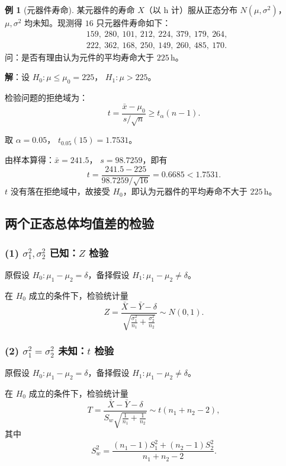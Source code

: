 \documentclass[11pt,a4paper]{report}
\theoremstyle{definition}
\newtheorem{example}{例}[chapter]
\begin{document}
\begin{example}[元器件寿命]
某元器件的寿命 $X$（以 h 计）服从正态分布 $N(\mu,\sigma^{2})$，$\mu,\sigma^{2}$ 均未知。现测得 $16$ 只元器件寿命如下：
\[
\begin{aligned}
&159,\ 280,\ 101,\ 212,\ 224,\ 379,\ 179,\ 264,\\
&222,\ 362,\ 168,\ 250,\ 149,\ 260,\ 485,\ 170.
\end{aligned}
\]
问：是否有理由认为元件的平均寿命大于 $225\,\mathrm{h}$。

\textbf{解}：设 $H_{0}\colon\mu\leq\mu_{0}=225$， $H_{1}\colon\mu>225$。

检验问题的拒绝域为：
\[
t=\frac{\bar{x}-\mu_{0}}{s/\sqrt{n}}\geq t_{\alpha}(n-1).
\]

取 $\alpha=0.05$， $t_{0.05}(15)=1.7531$。

由样本算得：$\bar{x}=241.5$， $s=98.7259$，即有
\[
t=\frac{241.5-225}{98.7259/\sqrt{16}}=0.6685<1.7531.
\]
$t$ 没有落在拒绝域中，故接受 $H_{0}$，即认为元器件的平均寿命不大于 $225\,\mathrm{h}$。
\end{example}

\subsection{两个正态总体均值差的检验}

\subsubsection*{(1) $\sigma_{1}^{2},\sigma_{2}^{2}$ 已知：$Z$ 检验}

原假设 $H_{0}\colon\mu_{1}-\mu_{2}=\delta$，备择假设 $H_{1}\colon\mu_{1}-\mu_{2}\neq\delta$。

在 $H_{0}$ 成立的条件下，检验统计量
\[
Z=\frac{\bar{X}-\bar{Y}-\delta}{\sqrt{\frac{\sigma_{1}^{2}}{n_{1}}+\frac{\sigma_{2}^{2}}{n_{2}}}}\sim N(0,1).
\]

\subsubsection*{(2) $\sigma_{1}^{2}=\sigma_{2}^{2}$ 未知：$t$ 检验}

原假设 $H_{0}\colon\mu_{1}-\mu_{2}=\delta$，备择假设 $H_{1}\colon\mu_{1}-\mu_{2}\neq\delta$。

在 $H_{0}$ 成立的条件下，检验统计量
\[
T=\frac{\bar{X}-\bar{Y}-\delta}{S_{w}\sqrt{\frac{1}{n_{1}}+\frac{1}{n_{2}}}}\sim t(n_{1}+n_{2}-2),
\]
其中
\[
S_{w}^{2}=\frac{(n_{1}-1)S_{1}^{2}+(n_{2}-1)S_{2}^{2}}{n_{1}+n_{2}-2}.
\]
\end{document}
